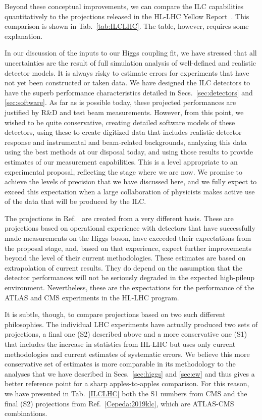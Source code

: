 Beyond these conceptual improvements, we can compare the ILC
capabilities quantitatively to the projections released in the HL-LHC
Yellow Report~\cite{Cepeda:2019klc}.  This  comparison is shown
in Tab.~\ref{tab:ILCLHC}.   The table, however, requires some explanation.

In our discussion of the inputs to our Higgs coupling fit, we have
stressed that all uncertainties are the result of full simulation
analysis of well-defined and realistic detector  models.   It is
always risky to estimate errors for experiments that have not yet been
constructed or taken data.   We have designed the ILC detectors to
have the 
superb performance characteristics detailed in
Secs.~\ref{sec:detectors} and \ref{sec:software}.   As far as is
possible today, these projected performances are justified by R\&D and
test beam measurements.   However, from this point, we wished to be
quite conservative, creating detailed software models of these
detectors, using these to create digitized data that includes
realistic detector response and instrumental and beam-related backgrounds,
analyzing this data using the best methods at our
disposal today, and using those results to provide estimates of our
measurement capabilities.   This is a level appropriate to an
experimental proposal, reflecting the stage where we are now.  We
promise to achieve the levels of precision that we have discussed
here, and we fully expect to exceed this expectation when a large
collaboration of physicists makes active use of the data that will be
produced by the ILC.

The projections in Ref.~\cite{Cepeda:2019klc} are created from a very
different basis.  These are projections based on operational experience
with detectors that have successfully  made measurements on the Higgs
boson, have exceeded their expectations from the proposal stage, and,
based on that experience, expect further improvements beyond the level
of their current methodologies.  These estimates are based on
extrapolation of current results.   They do depend on the assumption that the
detector performances will not be seriously degraded in the expected
high-pileup environment.   Nevertheless, these are the
expectations for the performance of the ATLAS and CMS experiments in
the HL-LHC program.

It is subtle, though, to compare projections based on two such
different philosophies.  The individual LHC experiments have actually
produced two sets of projections, a final one (S2) described above
and a more conservative one (S1) that includes the increase in
statistics from HL-LHC but uses only current methodologies and current
estimates of systematic errors.   We believe this more 
conservative set of estimates is more comparable in its methodology to
the analyses that we have described in Secs.~\ref{sec:higgs} and
\ref{sec:ew} and thus gives a better reference point for a sharp 
apples-to-apples comparison. 
  For this reason, we have presented 
in Tab.~\ref{ILCLHC}  both the S1
numbers from CMS and the final (S2) projections from
Ref.~\ref{Cepeda:2019klc}, which are ATLAS-CMS combinations. 

